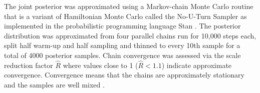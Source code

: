 \documentclass{article}
\begin{document}
%
%


The joint posterior was approximated using a Markov-chain Monte Carlo routine that is a variant of Hamiltonian Monte Carlo called the No-U-Turn Sampler \citep{Hoffman2014} as implemented in the probabilistic programming language Stan \citep{2014stan}. The posterior distribution was approximated from four parallel chains run for 10,000 steps each, split half warm-up and half sampling and thinned to every 10th sample for a total of 4000 posterior samples. Chain convergence was assessed via the scale reduction factor \(\hat{R}\) where values close to 1 (\(\hat{R} < 1.1\)) indicate approximate convergence. Convergence means that the chains are approximately stationary and the samples are well mixed \citep{Gelman2013d}.
\end{document}
